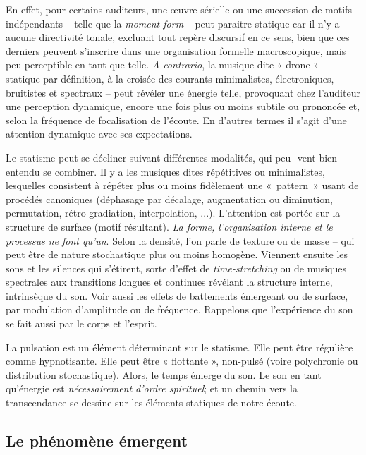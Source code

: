 En effet, pour certains auditeurs, une œuvre sérielle ou une succession de motifs indépendants -- telle que la \textit{moment-form} -- peut paraitre statique car il n'y a aucune directivité tonale, excluant tout repère discursif en ce sens, bien que ces derniers peuvent s'inscrire dans une organisation formelle macroscopique, mais peu perceptible en tant que telle. \textit{A contrario}, la musique dite « drone »  -- statique par définition, à la croisée des courants minimalistes, électroniques, bruitistes et spectraux -- peut révéler une énergie telle, provoquant chez l'auditeur une perception dynamique, encore une fois plus ou moins subtile ou prononcée et, selon la fréquence de focalisation de l'écoute. En d'autres termes il s'agit d'une attention dynamique avec ses expectations.

Le statisme peut se décliner suivant différentes modalités, qui peu- vent bien entendu se combiner. Il y a les musiques dites répétitives ou minimalistes, lesquelles consistent à répéter plus ou moins fidèlement une \hbox{« pattern »} usant de procédés canoniques (déphasage par décalage, augmentation ou diminution, permutation, rétro-gradiation, interpolation, ...). L'attention est portée sur la structure de surface (motif résultant). \textit{La  forme, l'organisation interne et le processus ne font qu'un}. %
 Selon la densité, l'on parle de texture ou de masse -- qui peut être de nature stochastique plus ou moins homogène. Viennent ensuite les sons et les silences qui s'étirent, sorte d'effet de \textit{time-stretching} ou de musiques spectrales aux transitions longues et continues révélant la structure interne, intrinsèque du son. Voir aussi les effets de battements émergeant ou de surface, par modulation d'amplitude ou de fréquence. Rappelons que l'expérience du son se fait aussi par le corps et l'esprit. 

La pulsation est un élément déterminant sur le statisme. Elle peut être régulière comme hypnotisante. Elle peut être « flottante », non-pulsé (voire polychronie ou distribution stochastique). Alors, le temps émerge du son. Le son en tant qu'énergie est \textit{nécessairement d’ordre spirituel}; %
et un chemin vers la transcendance se dessine sur les éléments statiques de notre écoute.

\subsection*{Le phénomène émergent}
\label{emergent}
 
